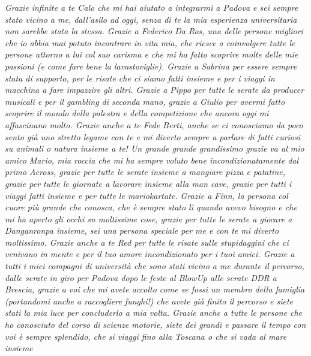\noindent \textit{
                  Grazie infinite a te Calo che mi hai aiutato a integrarmi a Padova e sei sempre stato vicino a me, dall'asilo ad oggi, senza di te la mia esperienza universitaria non sarebbe stata la stessa. Grazie a Federico Da Ros, una delle persone migliori che io abbia mai potuto incontrare in vita mia, che riesce a coinvolgere tutte le persone attorno a lui col suo carisma e che mi ha fatto scoprire molte delle mie passioni (e come fare bene la lavastoviglie).
                  Grazie a Sabrina per essere sempre stata di supporto, per le risate che ci siamo fatti insieme e per i viaggi in macchina a fare impazzire gli altri. Grazie a Pippo per tutte le serate da producer musicali e per il gambling di seconda mano, grazie a Giulio per avermi fatto scoprire il mondo della palestra e della competizione che ancora oggi mi affascinano molto. Grazie anche a te Fede Berti, anche se ci conosciamo da poco sento già uno stretto legame con te e mi diverto sempre a parlare di fatti curiosi su animali o natura insieme a te!
                  Un grande grande grandissimo grazie va al mio amico Mario, mia roccia che mi ha sempre voluto bene incondizionatamente dal primo Across, grazie per tutte le serate insieme a mangiare pizza e patatine, grazie per tutte le giornate a lavorare insieme alla man cave, grazie per tutti i viaggi fatti insieme e per tutte le mariokartate.
                  Grazie a Finn, la persona col cuore più grande che conosca, che è sempre stato lì quando avevo bisogno e che mi ha aperto gli occhi su moltissime cose, grazie per tutte le serate a giocare a Danganronpa insieme, sei una persona speciale per me e con te mi diverto moltissimo. Grazie anche a te Red per tutte le risate sulle stupidaggini che ci venivano in mente e per il tuo amore incondizionato per i tuoi amici. Grazie a tutti i miei compagni di università che sono stati vicino a me durante il percorso, dalle serate in giro per Padova dopo le feste al BlowUp alle serate DDR a Brescia, grazie a voi che mi avete accolto come se fossi un membro della famiglia (portandomi anche a raccogliere funghi!) che avete già finito il percorso e siete stati la mia luce per concluderlo a mia volta.
                  Grazie anche a tutte le persone che ho conosciuto del corso di scienze motorie, siete dei grandi e passare il tempo con voi è sempre splendido, che si viaggi fino alla Toscana o che si vada al mare insieme}\\
\newline
